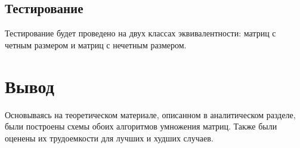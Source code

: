 \subsection{Тестирование}
Тестирование будет проведено на двух классах эквивалентности: матриц с четным размером и матриц с нечетным размером. 

\section{Вывод}

Основываясь на теоретическом материале, описанном в аналитическом разделе, были построены схемы обоих алгоритмов умножения матриц. Также были оценены их трудоемкости для лучших и худших случаев.

